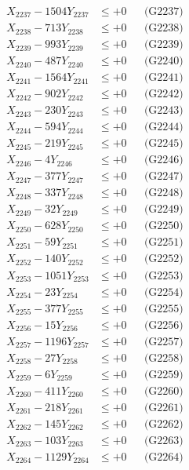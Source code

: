 \documentclass[a4paper,10pt]{article}
\begin{document}
{\begin{align}
X_{2237} - 1504Y_{2237} &\leq +0 && \text{(G2237)} \\
X_{2238} - 713Y_{2238} &\leq +0 && \text{(G2238)} \\
X_{2239} - 993Y_{2239} &\leq +0 && \text{(G2239)} \\
X_{2240} - 487Y_{2240} &\leq +0 && \text{(G2240)} \\
\allowbreak
X_{2241} - 1564Y_{2241} &\leq +0 && \text{(G2241)} \\
X_{2242} - 902Y_{2242} &\leq +0 && \text{(G2242)} \\
X_{2243} - 230Y_{2243} &\leq +0 && \text{(G2243)} \\
X_{2244} - 594Y_{2244} &\leq +0 && \text{(G2244)} \\
X_{2245} - 219Y_{2245} &\leq +0 && \text{(G2245)} \\
X_{2246} - 4Y_{2246} &\leq +0 && \text{(G2246)} \\
X_{2247} - 377Y_{2247} &\leq +0 && \text{(G2247)} \\
X_{2248} - 337Y_{2248} &\leq +0 && \text{(G2248)} \\
X_{2249} - 32Y_{2249} &\leq +0 && \text{(G2249)} \\
X_{2250} - 628Y_{2250} &\leq +0 && \text{(G2250)} \\
\allowbreak
X_{2251} - 59Y_{2251} &\leq +0 && \text{(G2251)} \\
X_{2252} - 140Y_{2252} &\leq +0 && \text{(G2252)} \\
X_{2253} - 1051Y_{2253} &\leq +0 && \text{(G2253)} \\
X_{2254} - 23Y_{2254} &\leq +0 && \text{(G2254)} \\
X_{2255} - 377Y_{2255} &\leq +0 && \text{(G2255)} \\
X_{2256} - 15Y_{2256} &\leq +0 && \text{(G2256)} \\
X_{2257} - 1196Y_{2257} &\leq +0 && \text{(G2257)} \\
X_{2258} - 27Y_{2258} &\leq +0 && \text{(G2258)} \\
X_{2259} - 6Y_{2259} &\leq +0 && \text{(G2259)} \\
X_{2260} - 411Y_{2260} &\leq +0 && \text{(G2260)} \\
\allowbreak
X_{2261} - 218Y_{2261} &\leq +0 && \text{(G2261)} \\
X_{2262} - 145Y_{2262} &\leq +0 && \text{(G2262)} \\
X_{2263} - 103Y_{2263} &\leq +0 && \text{(G2263)} \\
X_{2264} - 1129Y_{2264} &\leq +0 && \text{(G2264)} \\

\end{align}}
\end{document}
